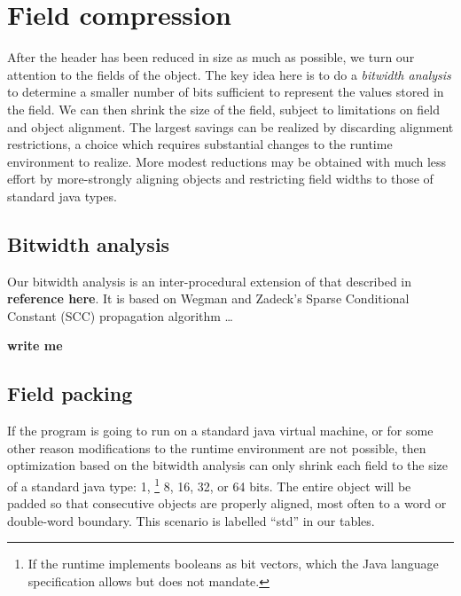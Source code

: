 \documentclass[preprint]{acmconf}
\begin{document}
\section{Field compression}
After the header has been reduced in size as much as possible, we turn
our attention to the fields of the object.  The key idea here is to
do a {\it bitwidth analysis} \cite{stephenson00,ananian99:tech}
to determine a
smaller number of bits sufficient to represent the values stored in
the field.  We can then shrink the size of the field, subject to
limitations on field and object alignment.  The largest savings can be
realized by discarding alignment restrictions, a choice which requires
substantial changes to the runtime environment to realize.  More
modest reductions may be obtained with much less effort by
more-strongly aligning objects and restricting field widths to
those of standard java types.

\subsection{Bitwidth analysis}
Our bitwidth analysis is an inter-procedural extension of that
described in {\bf reference here}.  It is based on Wegman and Zadeck's
Sparse Conditional Constant (SCC) propagation algorithm
\cite{wegman91:scc}\ldots

{\bf write me}

\subsection{Field packing}
\label{sec:field-packing}
If the program is going to run on a standard java virtual machine, or
for some other reason modifications to the runtime environment are not
possible, then optimization based on the bitwidth analysis can only
shrink each field to the size of a standard java type: 1,%
\footnote{If the runtime implements booleans as bit vectors, which the
  Java language specification allows but does not mandate.}
8, 16, 32, or 64 bits.  The entire object will be padded so that
consecutive objects are properly aligned, most often to a word or
double-word boundary.  This scenario is labelled ``std'' in our tables.
\end{document}
